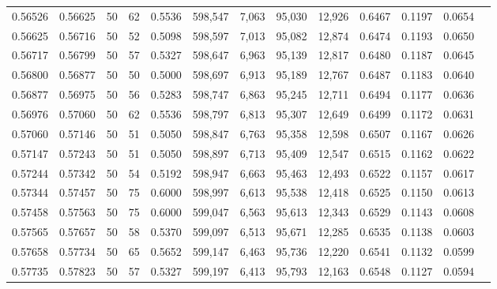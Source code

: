 \begin{tabular}{rrrrrrrrrrrrr}
0.56526 & 0.56625 &    50 &  62 &                                     0.5536 & 598,547 &   7,063 &  95,030 &  12,926 & 0.6467 & 0.1197 & 0.0654 \\
0.56625 & 0.56716 &    50 &  52 &                                     0.5098 & 598,597 &   7,013 &  95,082 &  12,874 & 0.6474 & 0.1193 & 0.0650 \\
0.56717 & 0.56799 &    50 &  57 &                                     0.5327 & 598,647 &   6,963 &  95,139 &  12,817 & 0.6480 & 0.1187 & 0.0645 \\
0.56800 & 0.56877 &    50 &  50 &                                     0.5000 & 598,697 &   6,913 &  95,189 &  12,767 & 0.6487 & 0.1183 & 0.0640 \\
0.56877 & 0.56975 &    50 &  56 &                                     0.5283 & 598,747 &   6,863 &  95,245 &  12,711 & 0.6494 & 0.1177 & 0.0636 \\
0.56976 & 0.57060 &    50 &  62 &                                     0.5536 & 598,797 &   6,813 &  95,307 &  12,649 & 0.6499 & 0.1172 & 0.0631 \\
0.57060 & 0.57146 &    50 &  51 &                                     0.5050 & 598,847 &   6,763 &  95,358 &  12,598 & 0.6507 & 0.1167 & 0.0626 \\
0.57147 & 0.57243 &    50 &  51 &                                     0.5050 & 598,897 &   6,713 &  95,409 &  12,547 & 0.6515 & 0.1162 & 0.0622 \\
0.57244 & 0.57342 &    50 &  54 &                                     0.5192 & 598,947 &   6,663 &  95,463 &  12,493 & 0.6522 & 0.1157 & 0.0617 \\
0.57344 & 0.57457 &    50 &  75 &                                     0.6000 & 598,997 &   6,613 &  95,538 &  12,418 & 0.6525 & 0.1150 & 0.0613 \\
0.57458 & 0.57563 &    50 &  75 &                                     0.6000 & 599,047 &   6,563 &  95,613 &  12,343 & 0.6529 & 0.1143 & 0.0608 \\
0.57565 & 0.57657 &    50 &  58 &                                     0.5370 & 599,097 &   6,513 &  95,671 &  12,285 & 0.6535 & 0.1138 & 0.0603 \\
0.57658 & 0.57734 &    50 &  65 &                                     0.5652 & 599,147 &   6,463 &  95,736 &  12,220 & 0.6541 & 0.1132 & 0.0599 \\
0.57735 & 0.57823 &    50 &  57 &                                     0.5327 & 599,197 &   6,413 &  95,793 &  12,163 & 0.6548 & 0.1127 & 0.0594 \\

\end{tabular}
